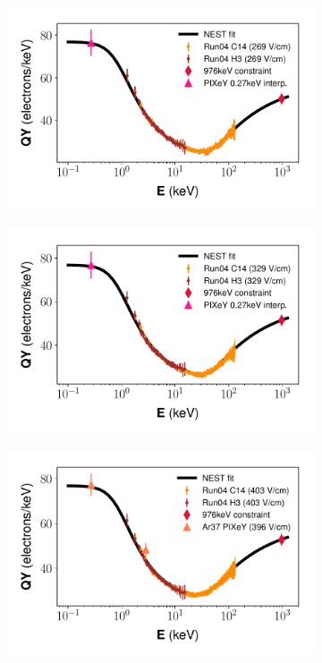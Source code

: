 \begin{figure}[h!]
\begin{subfigure}{0.5\textwidth}
  \caption{}
\end{subfigure}
\begin{subfigure}{0.5\textwidth}
  \centering
  \includegraphics[width=\textwidth]{Figures/Yields_fit_old/NEST_fit_269Vcm_old.pdf}
  \caption{}
\end{subfigure}%
\begin{subfigure}{0.5\textwidth}
  \centering
  \includegraphics[width=\textwidth]{Figures/Yields_fit_old/NEST_fit_329Vcm_old.pdf}
  \caption{}
\end{subfigure}
\begin{subfigure}{0.5\textwidth}
  \centering
  \includegraphics[width=\textwidth]{Figures/Yields_fit_old/NEST_fit_403Vcm_old.pdf}

\end{subfigure}
\end{figure}

